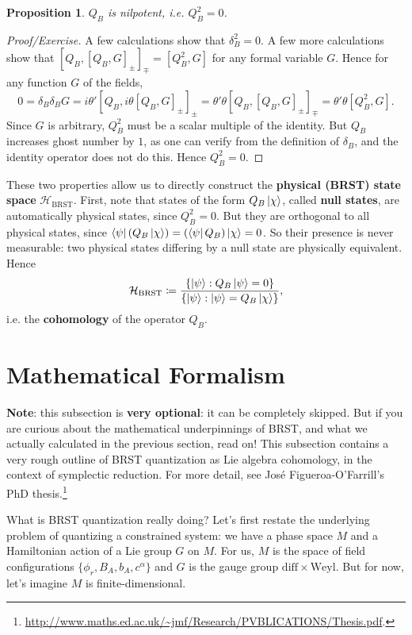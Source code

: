 \documentclass{report}
\theoremstyle{plain}
\newtheorem{proposition}[theorem]{Proposition}
\theoremstyle{definition}
\theoremstyle{remark}
\newcommand{\cH}{\mathcal{H}}
\newcommand{\diff}{\mathrm{diff}}
\newcommand{\Weyl}{\mathrm{Weyl}}
\begin{document}
\begin{proposition}
  $Q_B$ is nilpotent, i.e. $Q_B^2 = 0$.
\end{proposition}

\begin{proof}[Proof/Exercise]
  A few calculations show that $\delta_B^2 = 0$. A few more
  calculations show that $[Q_B, [Q_B, G]_{\pm}]_{\mp} = [Q_B^2, G]$
  for any formal variable $G$. Hence for any function $G$ of the
  fields,
  \[ 0 = \delta_B \delta_B G = i\theta' [Q_B, i\theta [Q_B, G]_{\pm}]_{\pm} = \theta' \theta [Q_B, [Q_B, G]_{\pm}]_{\mp} = \theta' \theta [Q_B^2, G]. \]
  Since $G$ is arbitrary, $Q_B^2$ must be a scalar multiple of the
  identity. But $Q_B$ increases ghost number by $1$, as one can verify
  from the definition of $\delta_B$, and the identity operator does
  not do this. Hence $Q_B^2 = 0$.
\end{proof}

These two properties allow us to directly construct the {\bf physical
  (BRST) state space} $\cH_{\text{BRST}}$. First, note that states of
the form $Q_B\ket{\chi}$, called {\bf null states}, are automatically
physical states, since $Q_B^2 = 0$. But they are orthogonal to all
physical states, since $\bra{\psi}(Q_B\ket{\chi}) =
(\bra{\psi}Q_B)\ket{\chi} = 0$. So their presence is never measurable:
two physical states differing by a null state are physically
equivalent. Hence
\[ \cH_{\text{BRST}} \coloneqq \frac{\{\ket{\psi} : Q_B\ket{\psi} = 0\}}{\{\ket{\psi} : \ket{\psi} = Q_B\ket{\chi}\}}, \]
i.e. the {\bf cohomology} of the operator $Q_B$.

\section{Mathematical Formalism}

{\bf Note}: this subsection is {\bf very optional}: it can be
completely skipped. But if you are curious about the mathematical
underpinnings of BRST, and what we actually calculated in the previous
section, read on! This subsection contains a very rough outline of
BRST quantization as Lie algebra cohomology, in the context of
symplectic reduction. For more detail, see Jos\'e Figueroa-O'Farrill's
PhD thesis.\footnote{\url{http://www.maths.ed.ac.uk/~jmf/Research/PVBLICATIONS/Thesis.pdf}.}

What is BRST quantization really doing? Let's first restate the
underlying problem of quantizing a constrained system: we have a phase
space $M$ and a Hamiltonian action of a Lie group $G$ on $M$. For us,
$M$ is the space of field configurations $\{\phi_r, B_A, b_A,
c^\alpha\}$ and $G$ is the gauge group $\diff \times \Weyl$. But for
now, let's imagine $M$ is finite-dimensional.
\end{document}
